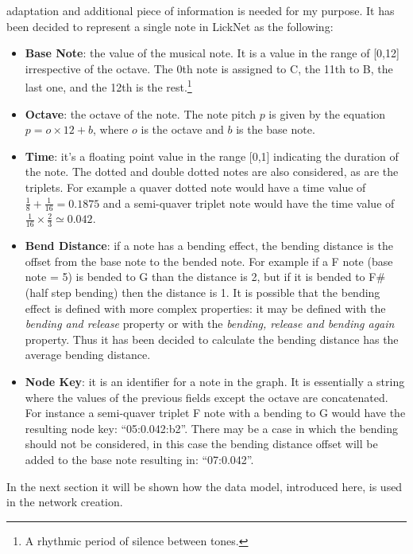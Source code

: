 \documentclass{llncs}
\begin{document}
adaptation and additional piece of 
information is needed for my purpose. It has been decided
to represent a single note in LickNet as the following:
\begin{itemize}
	\item \textbf{Base Note}: the value of the musical note. It is
a value in the range of [0,12] irrespective of the octave. The 0th
note is assigned to C, the 11th to B, the last one, and the 12th is the rest.\footnote{A
rhythmic period of silence between tones.}
	\item \textbf{Octave}: the octave of the note. The note pitch $p$ is given
by the equation $p = o \times 12 + b $, where $o$ is the octave and $b$
is the base note.
	\item \textbf{Time}: it's a floating point value in the range [0,1] indicating the duration of
the note. The dotted and double dotted notes are also considered, as are
the triplets. For example a quaver dotted note would have a
time value of $\frac{1}{8} + \frac{1}{16} = 0.1875$ and a semi-quaver triplet note
would have the time value of $\frac{1}{16} \times \frac{2}{3} \simeq 0.042$.
	\item \textbf{Bend Distance}: if a note has a bending effect, the bending
distance is the offset from the base note to the bended note. For
example if a F note (base note = 5) is bended to G than the distance is
2, but if it is bended to F\# (half step bending) then the distance is 1. It
is possible that the bending effect is defined with more complex
properties: it may be defined with the \emph{bending and release}
property or with the \emph{bending,
release and bending again} property. Thus it has been decided to calculate
the bending distance has the average bending distance.
	\item \textbf{Node Key}: it is an identifier for a note in the graph. It is
essentially a string where the values of the previous fields except the
octave are
concatenated. For instance a semi-quaver triplet F note with a bending
to G would have the resulting node key: ``05:0.042:b2''. There may be a
case in which the bending should not be considered, in this case the bending distance offset 
will be added to the base note resulting in: ``07:0.042''.
\end{itemize}

In the next section it will be shown how the data model, introduced here, is used in the
network creation.
\end{document}
